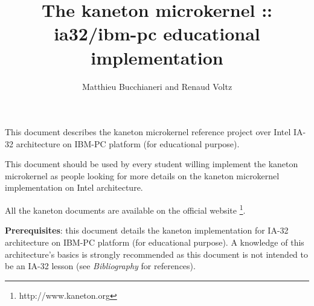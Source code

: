 %
%
%
%
%
%

%
%

\def\path{../../..}

%
%



%
%

\rhead{}

%
%

\title{The kaneton microkernel :: ia32/ibm-pc educational implementation
       \logos}

%
%

\author{\small{Matthieu Bucchianeri} and
        \small{Renaud Voltz}}

%
%



%
%

\maketitle

%
%

This document describes the kaneton microkernel reference project over
Intel IA-32 architecture on IBM-PC platform (for educational purpose).

This document should be used by every student willing implement the
kaneton microkernel as people looking for more details on the kaneton
microkernel implementation on Intel architecture.

All the kaneton documents are available on
the official website
  \footnote{http://www.kaneton.org}.

\textbf{Prerequisites}: this document details the kaneton implementation
for IA-32 architecture on IBM-PC platform (for educational purpose). A
knowledge of this architecture's basics is strongly recommended as
this document is not intended to be an IA-32 lesson (see
\textit{Bibliography} for references).

%
%

\toc

%
%













